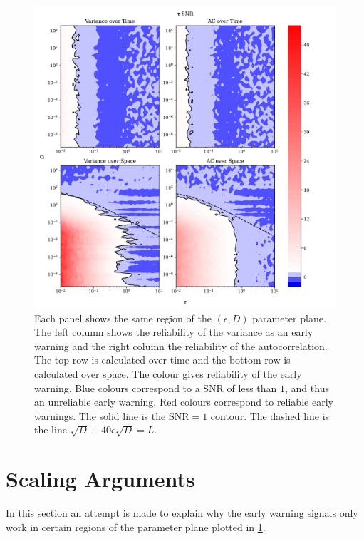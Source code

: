 \begin{figure}
  \centering
  \includegraphics[width=\textwidth,keepaspectratio]{parameter_plane}
  \caption[The quality of early warning signals in the $\epsilon$ and $D$ plane]{Each panel shows the same region of the $(\epsilon,D)$ parameter plane. The left column shows the
    reliability of the variance as an early warning and the right column the reliability of the autocorrelation. The top row is calculated over time and the bottom row is calculated over space.
    The colour gives reliability of the early warning. Blue colours correspond to a SNR of less than $1$, and thus an unreliable early warning. Red colours correspond to reliable early warnings.
    The solid line is the $\mathrm{SNR} = 1$ contour. The dashed line is the line $\sqrt{D} + 40\epsilon\sqrt{D} = L$.}
  \label{fig:parameter_plane}
\end{figure}


\section{Scaling Arguments}
\label{sec:scaling_arguments}
    
In this section an attempt is made to explain why the early warning signals only work in certain regions of the parameter plane plotted in \cref{fig:parameter_plane}.

